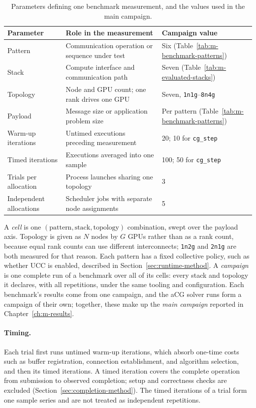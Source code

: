 \begin{table}[htbp]
\centering
\caption{Parameters defining one benchmark measurement, and the values used in the main campaign.}
\label{tab:m-experiment-parameters}
\footnotesize
\begin{tabularx}{\textwidth}{lYl}
\toprule
Parameter & Role in the measurement & Campaign value\\
\midrule
Pattern & Communication operation or sequence under test & Six (Table~\ref{tab:m-benchmark-patterns})\\
Stack & Compute interface and communication path & Seven (Table~\ref{tab:m-evaluated-stacks})\\
Topology & Node and GPU count; one rank drives one GPU & Seven, \texttt{1n1g}--\texttt{8n4g}\\
Payload & Message size or application problem size & Per pattern (Table~\ref{tab:m-benchmark-patterns})\\
\midrule
Warm-up iterations & Untimed executions preceding measurement & 20; 10 for \texttt{cg\_step}\\
Timed iterations & Executions averaged into one sample & 100; 50 for \texttt{cg\_step}\\
\midrule
Trials per allocation & Process launches sharing one topology & 3\\
Independent allocations & Scheduler jobs with separate node assignments & 5\\
\bottomrule
\end{tabularx}
\end{table}

A \emph{cell} is one $(\text{pattern}, \text{stack}, \text{topology})$ combination, swept over the payload axis. Topology is given as $N$ nodes by $G$ GPUs rather than as a rank count, because equal rank counts can use different interconnects; \texttt{1n2g} and \texttt{2n1g} are both measured for that reason. Each pattern has a fixed collective policy, such as whether UCC is enabled, described in Section~\ref{sec:runtime-method}. A \emph{campaign} is one complete run of a benchmark over all of its cells: every stack and topology it declares, with all repetitions, under the same tooling and configuration. Each benchmark's results come from one campaign, and the aCG solver runs form a campaign of their own; together, these make up the \emph{main campaign} reported in Chapter~\ref{ch:m-results}.

\paragraph{Timing.} Each trial first runs untimed warm-up iterations, which absorb one-time costs such as buffer registration, connection establishment, and algorithm selection, and then its timed iterations. A timed iteration covers the complete operation from submission to observed completion; setup and correctness checks are excluded (Section~\ref{sec:completion-method}). The timed iterations of a trial form one sample series and are not treated as independent repetitions.


